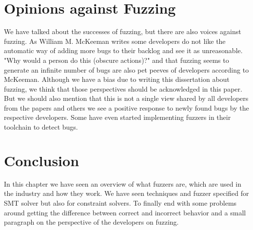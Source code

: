 \section{Opinions against Fuzzing}
\label{fuzzing:OpinionsAgainstFuzzing}
We have talked about the successes of fuzzing, but there are also voices against fuzzing. As William M. McKeeman \cite{39differentialTesting} writes some developers do not like the automatic way of adding more bugs to their backlog and see it as unreasonable. "Why would a person do this (obscure actions)?" and that fuzzing seems to generate an infinite number of bugs are also pet peeves of developers according to McKeeman.
Although we have a bias due to writing this dissertation about fuzzing, we think that those perspectives should be acknowledged in this paper. But we should also mention that this is not a single view shared by all developers from the papers \cite{43YinYang, 42FalconFuzzingConfigurationSettingsAndNormal, 47zhang2019finding} and others we see a positive response to newly found bugs by the respective developers. Some have even started implementing fuzzers \cite{44Stringfuzz} in their toolchain to detect bugs.

\section{Conclusion}
\label{fuzzing:conclusion}
In this chapter we have seen an overview of what fuzzers are, which are used in the industry and how they work. We have seen techniques and fuzzer specified for SMT solver but also for constraint solvers. To finally end with some problems around getting the difference between correct and incorrect behavior and a small paragraph on the perspective of the developers on fuzzing.

